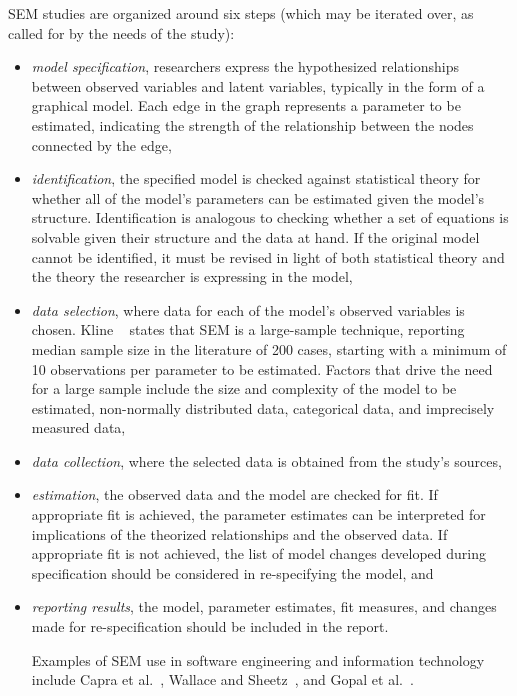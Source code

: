 SEM studies are organized around six steps (which may be iterated over, as called for by the needs of the study): 
\begin{itemize}
\item \textit{model specification}, researchers express the hypothesized relationships between observed variables and latent variables, typically in the form of a graphical model. Each edge in the graph represents a parameter to be estimated, indicating the strength of the relationship between the nodes connected by the edge,

\item \textit{identification}, the specified model is checked against statistical theory for whether all of the model’s parameters can be estimated given the model's structure. Identification is analogous to checking whether a set of equations is solvable given their structure and the data at hand. If the original model cannot be identified, it must be revised in light of both statistical theory and the theory the researcher is expressing in the model,

\item \textit{data selection}, where data for each of the model’s observed variables is chosen. Kline ~\cite{kline2015principles} states that SEM is a large-sample technique, reporting median sample size in the literature of 200 cases, starting with a minimum of 10 observations per parameter to be estimated.  Factors that drive the need for a large sample include the size and complexity of the model to be estimated, non-normally distributed data, categorical data, and imprecisely measured data,

\item \textit{data collection}, where the selected data is obtained from the study's sources,

\item \textit{estimation}, the observed data and the model are checked for fit.  If appropriate fit is achieved, the parameter estimates can be interpreted for implications of the theorized relationships and the observed data. If appropriate fit is not achieved, the list of model changes developed during specification should be considered in re-specifying the model, and

\item \textit{reporting results}, the model, parameter estimates,  fit measures, and changes made for re-specification should be included in the report.

Examples of SEM use in software engineering and information technology include Capra et al.~\cite{capra2008empirical}, Wallace and Sheetz~\cite{wallace2014adoption}, and Gopal et al.~\cite{gopal2005impact}.
\end{itemize}
	
